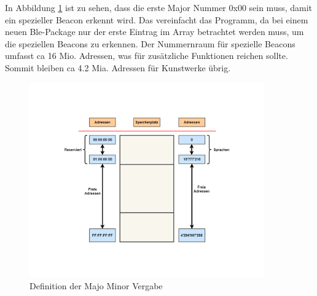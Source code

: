 In Abbildung \ref{fig:Bluetooth_MM_Vergabe} ist zu sehen, dass die erste Major Nummer 0x00 sein muss, damit ein spezieller Beacon erkennt wird. Das vereinfacht das Programm, da bei einem neuen Ble-Package nur der erste Eintrag im Array betrachtet werden muss, um die speziellen Beacons zu erkennen. Der Nummernraum für spezielle Beacons umfasst ca 16 Mio. Adressen, was für zusätzliche Funktionen reichen sollte. Sommit bleiben ca 4.2 Mia. Adressen für Kunstwerke übrig.

\begin{figure}[htbp!!!!]
	\centering
	\includegraphics[width=0.9\textwidth]{Data/Speicheradressen_picture.png}
	\caption[Software:MM Vergabe]{Definition der Majo Minor Vergabe}
	\label{fig:Bluetooth_MM_Vergabe}
\end{figure}


